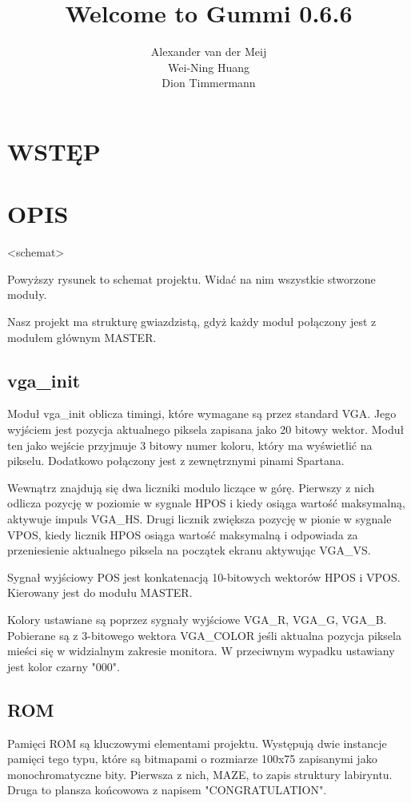 \documentclass[11pt]{article}
\title{\textbf{Welcome to Gummi 0.6.6}}
\author{Alexander van der Meij\\
		Wei-Ning Huang\\
		Dion Timmermann}
\date{}
\begin{document}
\maketitle

\section{WSTĘP}

\section{OPIS}

<schemat>

Powyższy rysunek to schemat projektu.
Widać na nim wszystkie stworzone moduły.

Nasz projekt ma strukturę gwiazdzistą, gdyż każdy moduł połączony jest z modułem głównym MASTER.

\subsection{vga\_init}

Moduł vga\_init oblicza timingi, które wymagane są przez standard VGA.
Jego wyjściem jest pozycja aktualnego piksela zapisana jako 20 bitowy wektor.
Moduł ten jako wejście przyjmuje 3 bitowy numer koloru, który ma wyświetlić na pikselu.
Dodatkowo połączony jest z zewnętrznymi pinami Spartana.

Wewnątrz znajdują się dwa liczniki modulo liczące w górę.
Pierwszy z nich odlicza pozycję w poziomie w sygnale HPOS i kiedy osiąga wartość maksymalną, aktywuje impuls VGA\_HS.
Drugi licznik zwiększa pozycję w pionie w sygnale VPOS, kiedy licznik HPOS osiąga wartość maksymalną i odpowiada za przeniesienie aktualnego piksela na początek ekranu aktywując VGA\_VS.

Sygnał wyjściowy POS jest konkatenacją 10-bitowych wektorów HPOS i VPOS. 
Kierowany jest do modułu MASTER.

Kolory ustawiane są poprzez sygnały wyjściowe VGA\_R, VGA\_G, VGA\_B.
Pobierane są z 3-bitowego wektora VGA\_COLOR jeśli aktualna pozycja piksela mieści się w widzialnym zakresie monitora.
W przeciwnym wypadku ustawiany jest kolor czarny "000".

\subsection{ROM}

Pamięci ROM są kluczowymi elementami projektu. Występują dwie instancje pamięci tego typu, które są bitmapami o rozmiarze 100x75 zapisanymi jako monochromatyczne bity.
Pierwsza z nich, MAZE, to zapis struktury labiryntu.
Druga to plansza końcowowa z napisem "CONGRATULATION".
\end{document}
